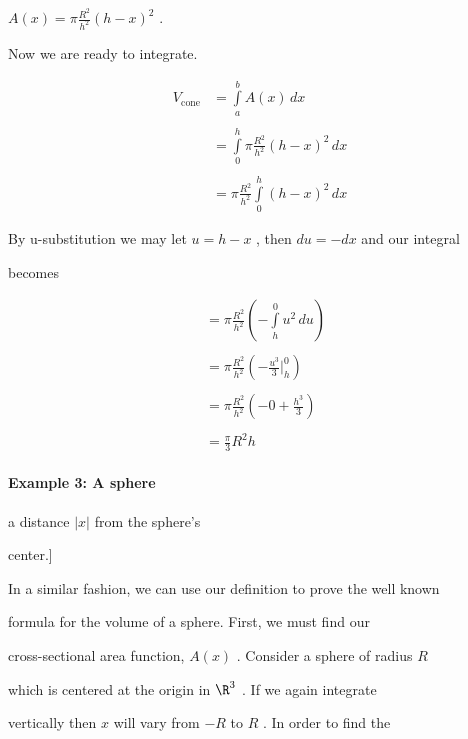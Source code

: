 $A(x)=\pi\frac{R^2}{h^2}(h-x)^2$ .



Now we are ready to integrate.



\begin{align} V _{\text{cone}} &= \int\limits _a^b A(x)\,dx \\\\ &= \int\limits _0^h \pi\frac{R^2}{h^2}(h-x)^2\,dx \\\\ &= \pi\frac{R^2}{h^2}\int\limits _0^h (h-x)^2\,dx \end{align} 



By u-substitution we may let $u=h-x$ , then $du=-dx$ and our integral

becomes



\begin{align} &= \pi\frac{R^2}{h^2}\left(-\int\limits _h^0 u^2\,du\right) \\\\ &= \pi\frac{R^2}{h^2}\left(-\frac{u^3}{3}\bigg| _h^0\right) \\\\ &= \pi\frac{R^2}{h^2}\left(-0 + \frac{h^3}{3}\right) \\\\ &= \frac{\pi}{3} R^2 h \end{align} 



\paragraph{Example 3: A sphere}




a distance $|x|$ from the sphere's

center.]



In a similar fashion, we can use our definition to prove the well known

formula for the volume of a sphere. First, we must find our

cross-sectional area function, $A(x)$ . Consider a sphere of radius $R$

which is centered at the origin in $\R^3$ . If we again integrate

vertically then $x$ will vary from $-R$ to $R$ . In order to find the

